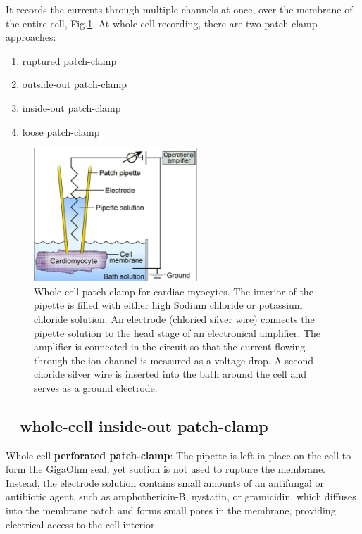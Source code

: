 It records the currents through multiple channels at once, over the membrane of
the entire cell, Fig.\ref{fig:whole-cell-patch-clamp}. At whole-cell recording,
there are two patch-clamp approaches:
\begin{enumerate}
  \item ruptured patch-clamp
  \item outside-out patch-clamp
  \item inside-out patch-clamp
  \item loose patch-clamp
\end{enumerate}

\begin{figure}[hbtp]
  \centerline{\includegraphics[height=5cm,
  angle=0]{./images/whole-cell-patch-clamp.eps}} \caption{Whole-cell patch clamp
  for cardiac myocytes. The interior of the pipette is filled with either high
  Sodium chloride or potassium chloride solution. An electrode (chloried silver
  wire) connects the pipette solution to the head stage of an electronical
  amplifier. The amplifier is connected in the circuit so that the current
  flowing through the ion channel is measured as a voltage drop. A second
  choride silver wire is inserted into the bath around the cell and serves as a
  ground electrode.}
  \label{fig:whole-cell-patch-clamp}
\end{figure}


\subsection{-- whole-cell inside-out patch-clamp}

Whole-cell {\bf perforated patch-clamp}: The pipette is left in place on the
cell to form the GigaOhm seal; yet suction is not used to rupture the membrane.
Instead, the electrode solution contains small amounts of an antifungal or
antibiotic agent, such as amphothericin-B, nystatin, or gramicidin, which
diffuses into the membrane patch and forms small pores in the membrane,
providing electrical access to the cell interior.

